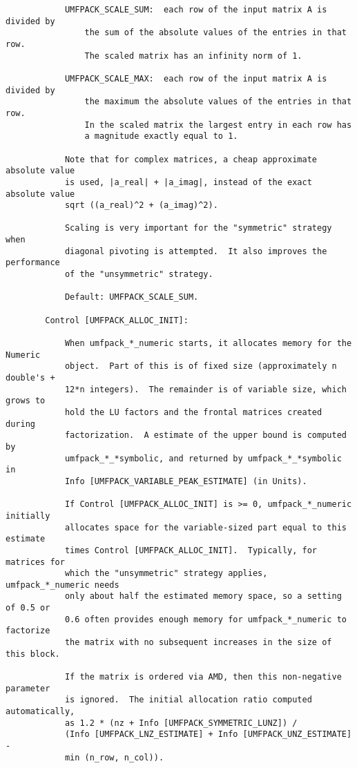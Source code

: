 \documentclass[11pt]{article}
\begin{document}
{\begin{verbatim}
            UMFPACK_SCALE_SUM:  each row of the input matrix A is divided by
                the sum of the absolute values of the entries in that row.
                The scaled matrix has an infinity norm of 1.

            UMFPACK_SCALE_MAX:  each row of the input matrix A is divided by
                the maximum the absolute values of the entries in that row.
                In the scaled matrix the largest entry in each row has
                a magnitude exactly equal to 1.

            Note that for complex matrices, a cheap approximate absolute value
            is used, |a_real| + |a_imag|, instead of the exact absolute value
            sqrt ((a_real)^2 + (a_imag)^2).

            Scaling is very important for the "symmetric" strategy when
            diagonal pivoting is attempted.  It also improves the performance
            of the "unsymmetric" strategy.

            Default: UMFPACK_SCALE_SUM.

        Control [UMFPACK_ALLOC_INIT]:

            When umfpack_*_numeric starts, it allocates memory for the Numeric
            object.  Part of this is of fixed size (approximately n double's +
            12*n integers).  The remainder is of variable size, which grows to
            hold the LU factors and the frontal matrices created during
            factorization.  A estimate of the upper bound is computed by
            umfpack_*_*symbolic, and returned by umfpack_*_*symbolic in
            Info [UMFPACK_VARIABLE_PEAK_ESTIMATE] (in Units).

            If Control [UMFPACK_ALLOC_INIT] is >= 0, umfpack_*_numeric initially
            allocates space for the variable-sized part equal to this estimate
            times Control [UMFPACK_ALLOC_INIT].  Typically, for matrices for
            which the "unsymmetric" strategy applies, umfpack_*_numeric needs
            only about half the estimated memory space, so a setting of 0.5 or
            0.6 often provides enough memory for umfpack_*_numeric to factorize
            the matrix with no subsequent increases in the size of this block.

            If the matrix is ordered via AMD, then this non-negative parameter
            is ignored.  The initial allocation ratio computed automatically,
            as 1.2 * (nz + Info [UMFPACK_SYMMETRIC_LUNZ]) /
            (Info [UMFPACK_LNZ_ESTIMATE] + Info [UMFPACK_UNZ_ESTIMATE] -
            min (n_row, n_col)).


\end{verbatim}}
\end{document}
